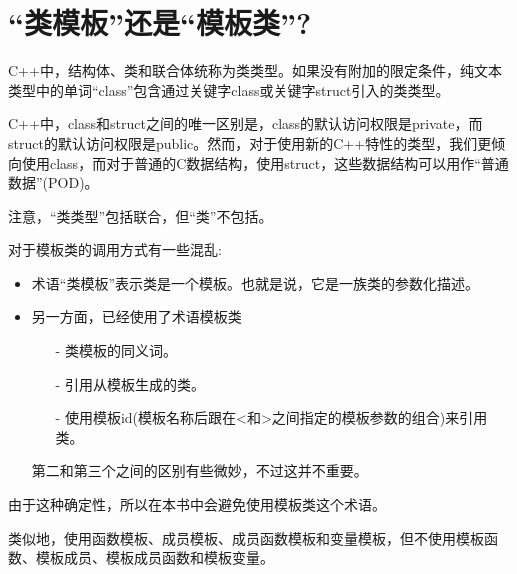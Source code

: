\section{“类模板”还是“模板类”?}
C++中，结构体、类和联合体统称为类类型。如果没有附加的限定条件，纯文本类型中的单词“class”包含通过关键字class或关键字struct引入的类类型。

\begin{notice}
C++中，class和struct之间的唯一区别是，class的默认访问权限是private，而struct的默认访问权限是public。然而，对于使用新的C++特性的类型，我们更倾向使用class，而对于普通的C数据结构，使用struct，这些数据结构可以用作“普通数据”(POD)。
\end{notice}

注意，“类类型”包括联合，但“类”不包括。

对于模板类的调用方式有一些混乱:

\begin{itemize}
\item 
术语“类模板”表示类是一个模板。也就是说，它是一族类的参数化描述。

\item 
另一方面，已经使用了术语模板类
\begin{itemize}
\item[-]
类模板的同义词。

\item[-]
引用从模板生成的类。

\item[-]
使用模板id(模板名称后跟在<和>之间指定的模板参数的组合)来引用类。
\end{itemize}

第二和第三个之间的区别有些微妙，不过这并不重要。
\end{itemize}

由于这种确定性，所以在本书中会避免使用模板类这个术语。

类似地，使用函数模板、成员模板、成员函数模板和变量模板，但不使用模板函数、模板成员、模板成员函数和模板变量。

















